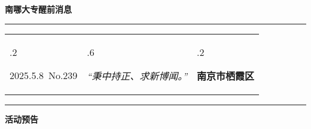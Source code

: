 \documentclass[letterpaper, 12pt]{article}
\begin{document}
\begin{center}
    \Huge\textbf{南哪大专醒前消息}
\end{center}
\vspace{4mm}
\hrule
\renewcommand\tabularxcolumn[1]{m{#1}}
\begin{tabularx}{\textwidth}{>{\hsize.2\hsize}X>{\hsize.6\hsize}X>{\hsize.2\hsize}X}
    \begin{flushleft}
        2025.5.8\, No.239
    \end{flushleft}
    &
    \begin{center}
        \textit{“秉中持正、求新博闻。”}
    \end{center}
    &
    \begin{flushright}
        \textbf{南京市栖霞区}
    \end{flushright}
\end{tabularx}
\vspace{-3.5mm}
\hrule
\vspace{4mm}
\centerline{\huge\textbf{活动预告}}
\end{document}

